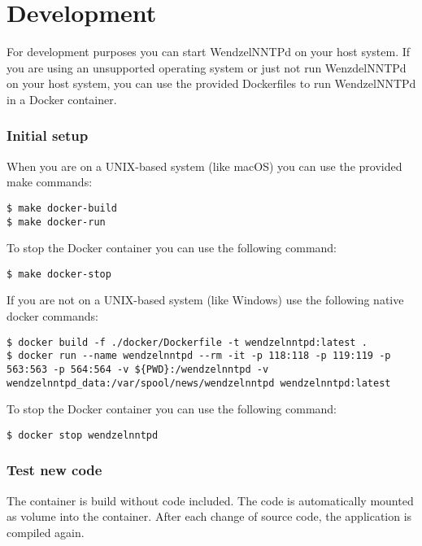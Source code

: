 \chapter{Development}

For development purposes you can start WendzelNNTPd on your host system. If you are using an unsupported operating system or just not run WenzdelNNTPd on your host system, you can use the provided Dockerfiles to run WendzelNNTPd in a Docker container.

\subsection{Initial setup}
When you are on a UNIX-based system (like macOS) you can use the provided make commands:
\begin{verbatim}
$ make docker-build
$ make docker-run
\end{verbatim}
To stop the Docker container you can use the following command:
\begin{verbatim}
$ make docker-stop
\end{verbatim}
If you are not on a UNIX-based system (like Windows) use the following native docker commands:
\begin{verbatim}
$ docker build -f ./docker/Dockerfile -t wendzelnntpd:latest .
$ docker run --name wendzelnntpd --rm -it -p 118:118 -p 119:119 -p 563:563 -p 564:564 -v ${PWD}:/wendzelnntpd -v wendzelnntpd_data:/var/spool/news/wendzelnntpd wendzelnntpd:latest
\end{verbatim}
To stop the Docker container you can use the following command:
\begin{verbatim}
$ docker stop wendzelnntpd
\end{verbatim}

\subsection{Test new code}
The container is build without code included. The code is automatically mounted as volume into the container. After each change of source code, the application is compiled again.
